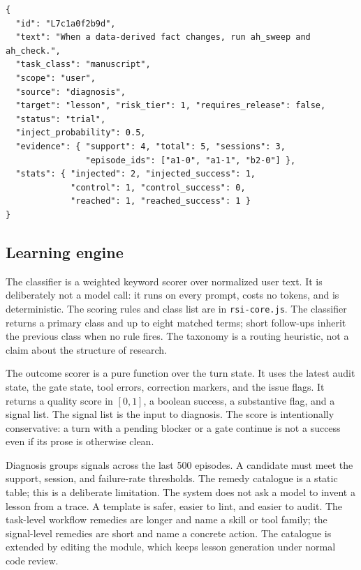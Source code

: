\begin{lstlisting}[style=json,caption={Abridged lesson record. The text is the only learned artifact; the rest is evidence and lifecycle state.},label={lst:lesson}]
{
  "id": "L7c1a0f2b9d",
  "text": "When a data-derived fact changes, run ah_sweep and ah_check.",
  "task_class": "manuscript",
  "scope": "user",
  "source": "diagnosis",
  "target": "lesson", "risk_tier": 1, "requires_release": false,
  "status": "trial",
  "inject_probability": 0.5,
  "evidence": { "support": 4, "total": 5, "sessions": 3,
                "episode_ids": ["a1-0", "a1-1", "b2-0"] },
  "stats": { "injected": 2, "injected_success": 1,
             "control": 1, "control_success": 0,
             "reached": 1, "reached_success": 1 }
}
\end{lstlisting}

\subsection{Learning engine}
\label{sec:engine}
The classifier is a weighted keyword scorer over normalized user text. It is deliberately not a model call: it runs on every prompt, costs no tokens, and is deterministic. The scoring rules and class list are in \texttt{rsi-core.js}. The classifier returns a primary class and up to eight matched terms; short follow-ups inherit the previous class when no rule fires. The taxonomy is a routing heuristic, not a claim about the structure of research.

The outcome scorer is a pure function over the turn state. It uses the latest audit state, the gate state, tool errors, correction markers, and the issue flags. It returns a quality score in $[0,1]$, a boolean success, a substantive flag, and a signal list. The signal list is the input to diagnosis. The score is intentionally conservative: a turn with a pending blocker or a gate continue is not a success even if its prose is otherwise clean.

Diagnosis groups signals across the last 500 episodes. A candidate must meet the support, session, and failure-rate thresholds. The remedy catalogue is a static table; this is a deliberate limitation. The system does not ask a model to invent a lesson from a trace. A template is safer, easier to lint, and easier to audit. The task-level workflow remedies are longer and name a skill or tool family; the signal-level remedies are short and name a concrete action. The catalogue is extended by editing the module, which keeps lesson generation under normal code review.

